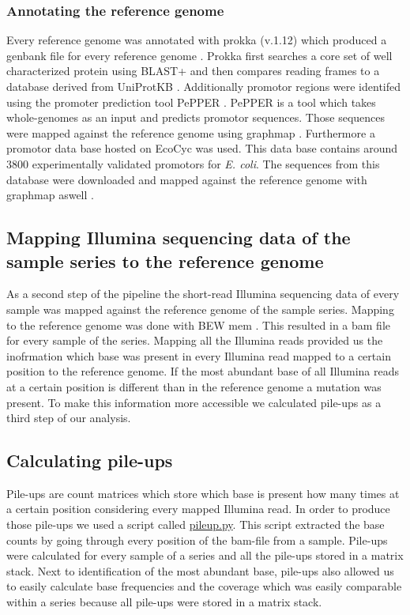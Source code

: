 \subsubsection{Annotating the reference genome}
Every reference genome was annotated with prokka (v.1.12) which produced a genbank file for every reference genome \cite{seemann_prokka:_2014}. Prokka first searches a core set of well characterized protein using BLAST+ and then compares reading frames to a database derived from UniProtKB \cite{seemann_:zap:_2019}. Additionally promotor regions were identifed using the promoter prediction tool PePPER \cite{pepper}. PePPER is a tool which takes whole-genomes as an input and predicts promotor sequences. Those sequences were mapped against the reference genome using graphmap \cite{sovic_fast_2016}. Furthermore a promotor data base hosted on EcoCyc was used. This data base contains around 3800 experimentally validated promotors for \textit{E. coli}\cite{noauthor_smarttable_nodate}. The sequences from this database were downloaded and mapped against the reference genome with graphmap aswell \cite{sovic_fast_2016}. 
\label{section:annotatiion_ref}

\subsection{Mapping Illumina sequencing data of the sample series to the reference genome}
As a second step of the pipeline the short-read Illumina sequencing data of every sample was mapped against the reference genome of the sample series. Mapping to the reference genome was done with BEW mem \cite{li_fast_2009}. This resulted in a bam file for every sample of the series. Mapping all the Illumina reads provided us the inofrmation which base was present in every Illumina read mapped to a certain position to the reference genome. If the most abundant base of all Illumina reads at a certain position is different than in the reference genome a mutation was present. To make this information more accessible we calculated pile-ups as a third step of our analysis. 

\subsection{Calculating pile-ups}
Pile-ups are count matrices which store which base is present how many times at a certain position considering every mapped Illumina read. In order to produce those pile-ups we used a script called \href{https://github.com/nahanoo/ESBL\_project/pileup.py}{pileup.py}. This script extracted the base counts by going through every position of the bam-file from a sample. Pile-ups were calculated for every sample of a series and all the pile-ups stored in a matrix stack. Next to identification of the most abundant base, pile-ups also allowed us to easily calculate base frequencies and the coverage which was easily comparable within a series because all pile-ups were stored in a matrix stack.

